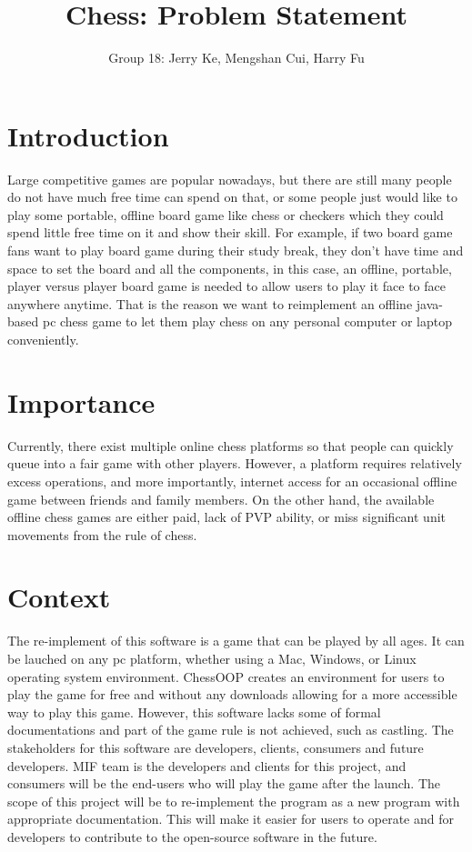 \documentclass[12pt,letterpaper]{article}
\title{Chess: Problem Statement}
\author{Group 18: Jerry Ke, Mengshan Cui, Harry Fu}
\date{}
\begin{document}
\maketitle
\section{Introduction}
Large competitive games are popular nowadays, but there are still many people do not have much free time can spend on that, or some people just would like to play some portable, offline board game like chess or checkers which they could spend little free time on it and show their skill. For example, if two board game fans want to play board game during their study break, they don’t have time and space to set the board and all the components, in this case, an offline, portable, player versus player board game is needed to allow users to play it face to face anywhere anytime. That is the reason we want to reimplement an offline java-based pc chess game to let them play chess on any personal computer or laptop conveniently. 
\section{Importance}
Currently, there exist multiple online chess platforms so that people can quickly queue into a fair game with other players. However, a platform requires relatively excess operations, and more importantly, internet access for an occasional offline game between friends and family members. On the other hand, the available offline chess games are either paid, lack of PVP ability, or miss significant unit movements from the rule of chess. 

\section{Context}
The re-implement of this software is a game that can be played by all ages. It can be lauched on any pc platform, whether using a Mac, Windows, or Linux operating system environment. ChessOOP creates an environment for users to play the game for free and without any downloads allowing for a more accessible way to play this game. However, this software lacks some of formal documentations and part of the game rule is not achieved, such as castling. The stakeholders for this software are developers, clients, consumers and future developers. MIF team is the developers and clients for this project, and consumers will be the end-users who will play the game after the launch. The scope of this project will be to re-implement the program as a new program with appropriate documentation. This will make it easier for users to operate and for developers to contribute to the open-source software in the future.

\end{document}
